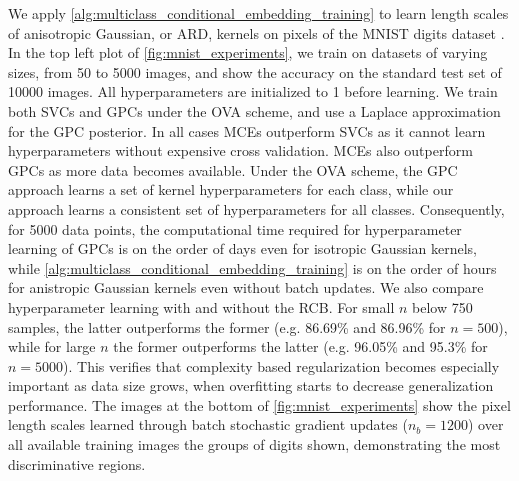 \documentclass{llncs}
\begin{document}
	We apply \cref{alg:multiclass_conditional_embedding_training} to learn length scales of anisotropic Gaussian, or \gls{ARD}, kernels on pixels of the MNIST digits dataset \citep{lecun1998gradient}. In the top left plot of \cref{fig:mnist_experiments}, we train on datasets of varying sizes, from 50 to 5000 images, and show the accuracy on the standard test set of 10000 images. All hyperparameters are initialized to 1 before learning. We train both \glspl{SVC} and \glspl{GPC} under the \gls{OVA} scheme, and use a Laplace approximation for the \gls{GPC} posterior. In all cases \glspl{MCE} outperform \glspl{SVC} as it cannot learn hyperparameters without expensive cross validation. \glspl{MCE} also outperform \glspl{GPC} as more data becomes available. Under the \gls{OVA} scheme, the \gls{GPC} approach learns a set of kernel hyperparameters for each class, while our approach learns a consistent set of hyperparameters for all classes. Consequently, for 5000 data points, the computational time required for hyperparameter learning of \glspl{GPC} is on the order of days even for isotropic Gaussian kernels, while \cref{alg:multiclass_conditional_embedding_training} is on the order of hours for anistropic Gaussian kernels even without batch updates. We also compare hyperparameter learning with and without the \gls{RCB}. For small $n$ below 750 samples, the latter outperforms the former (e.g. 86.69\% and 86.96\% for $n = 500$), while for large $n$ the former outperforms the latter (e.g. 96.05\% and 95.3\% for $n= 5000$). This verifies that complexity based regularization becomes especially important as data size grows, when overfitting starts to decrease generalization performance. The images at the bottom of \cref{fig:mnist_experiments} show the pixel length scales learned through batch stochastic gradient updates ($n_{b} = 1200$) over all available training images the groups of digits shown, demonstrating the most discriminative regions. %
	
	
\end{document}
